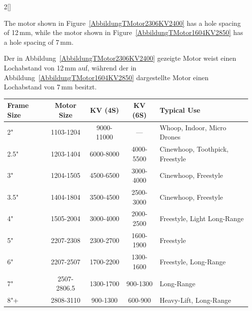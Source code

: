 \begin{paracol}{2}[]
\coleng

The motor shown in Figure~\ref{AbbildungTMotor2306KV2400} has a hole spacing of 12\,mm, while the motor shown in Figure~\ref{AbbildungTMotor1604KV2850} has a hole spacing of 7\,mm.

\colger

Der in Abbildung~\ref{AbbildungTMotor2306KV2400} gezeigte Motor weist einen Lochabstand von 12\,mm auf, während der in Abbildung~\ref{AbbildungTMotor1604KV2850} dargestellte Motor einen Lochabstand von 7\,mm besitzt.

\colende

\begin{table}[htb!]
\centering
\setlength{\tabcolsep}{6pt}
\renewcommand{\arraystretch}{1}
\label{TabelleMotorenuebersicht}
\begin{tabularx}{\linewidth}{lcccX}
\toprule
Frame Size & Motor Size      & KV (4S)                          & KV (6S)                         & Typical Use \\
\midrule
2"   & 1103-1204\phantom{.0} & 9000-11000                       & ---                             & Whoop, Indoor, Micro Drones \\
2.5" & 1203-1404\phantom{.0} & 6000-8000\phantom{0}             & 4000-5500                       & Cinewhoop, Toothpick, Freestyle \\
3"   & 1204-1505\phantom{.0} & 4500-6500\phantom{0}             & 3000-4000                       & Cinewhoop, Freestyle \\
3.5" & 1404-1804\phantom{.0} & 3500-4500\phantom{0}             & 2500-3000                       & Cinewhoop, Freestyle \\
4"   & 1505-2004\phantom{.0} & 3000-4000\phantom{0}             & 2000-2500                       & Freestyle, Light Long-Range \\
5"   & 2207-2308\phantom{.0} & 2300-2700\phantom{0}             & 1600-1900                       & Freestyle \\
6"   & 2207-2507\phantom{.0} & 1700-2200\phantom{0}             & 1300-1600                       & Freestyle, Long-Range \\
7"   & 2507-2806.5           & 1300-1700\phantom{0}             & \phantom{0}900-1300             & Long-Range \\
8"+  & 2808-3110\phantom{.0} & \phantom{0}900-1300\phantom{0}   & \phantom{0}600-900\phantom{0}   & Heavy-Lift, Long-Range \\
\bottomrule
\end{tabularx}
\end{table}
\FloatBarrier


\end{paracol}
